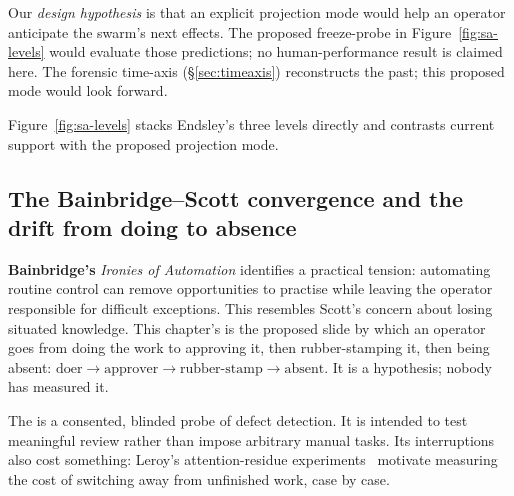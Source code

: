 \documentclass[11pt,a4paper]{article}
\theoremstyle{definition}
\theoremstyle{plain}
\begin{document}
Our \emph{design hypothesis} is that an explicit projection mode would help an
operator anticipate the swarm's next effects. The proposed freeze-probe in
Figure~\ref{fig:sa-levels} would evaluate those predictions; no human-performance
result is claimed here. The forensic time-axis (\S\ref{sec:timeaxis}) reconstructs
the past; this proposed mode would look forward.


Figure~\ref{fig:sa-levels} stacks Endsley's three levels directly and
contrasts current support with the proposed projection mode.

\subsection{The Bainbridge--Scott convergence and the drift from doing to absence}\label{sec:abdication}

\textbf{Bainbridge's} \emph{Ironies of Automation}
identifies a practical tension: automating routine control can remove opportunities
to practise while leaving the operator responsible for difficult exceptions.
This resembles Scott's concern about losing situated knowledge. This chapter's
 is the proposed slide by which an operator goes from
doing the work to approving it, then rubber-stamping it, then being absent:
$\text{doer}\to\text{approver}\to\text{rubber-stamp}\to\text{absent}$. It is
a hypothesis; nobody has measured it.

The  is a consented, blinded probe of defect
detection. It is intended to test meaningful review rather than impose arbitrary
manual tasks. Its interruptions also cost something: Leroy's
attention-residue experiments~ motivate measuring the cost of
switching away from unfinished work, case by case.
\end{document}
